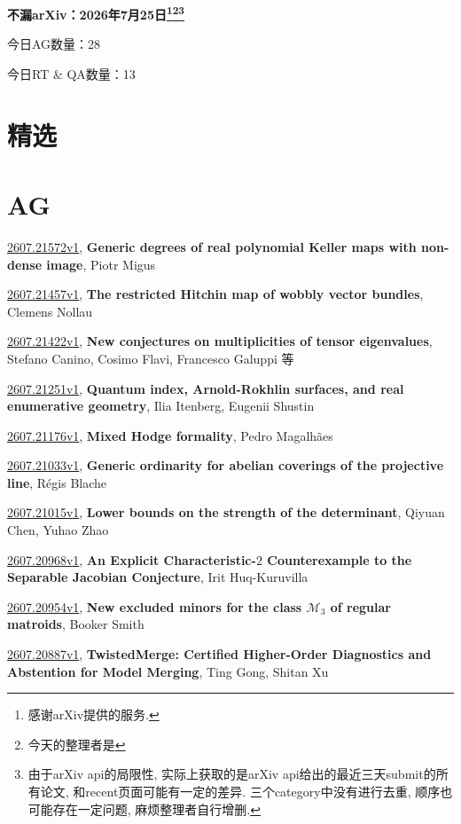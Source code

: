 \documentclass[9pt, a4paper]{article}
\theoremstyle{plain}
\theoremstyle{definition}
\theoremstyle{remark}
\newcommand{\arxiv}[3]{\href{https://arxiv.org/abs/#1}{#1}, \textbf{\textcolor{arxivblue}{#2}}, #3}
\newcommand{\AGnumber}{28}
\newcommand{\RTQAnumber}{13}
\newcommand{\NewestDate}{2026年7月25日}
\newcommand{\todayarXiver}{} %
\begin{document}
\begin{center}
    \Huge\textbf{不漏arXiv：\NewestDate\footnote{感谢arXiv提供的服务.}\footnote{今天的整理者是\todayarXiver}\footnote{由于arXiv api的局限性, 实际上获取的是arXiv api给出的最近三天submit的所有论文, 和recent页面可能有一定的差异. 三个category中没有进行去重, 顺序也可能存在一定问题, 麻烦整理者自行增删.}} \\
\end{center}

\setcounter{section}{-1}

\begin{center}
    今日AG数量：\AGnumber
    
    今日RT \& QA数量：\RTQAnumber
    
\end{center}


\section{精选}


\section{AG}
\arxiv{2607.21572v1}{Generic degrees of real polynomial Keller maps with non-dense image}{Piotr Migus}

\arxiv{2607.21457v1}{The restricted Hitchin map of wobbly vector bundles}{Clemens Nollau}

\arxiv{2607.21422v1}{New conjectures on multiplicities of tensor eigenvalues}{Stefano Canino, Cosimo Flavi, Francesco Galuppi 等}

\arxiv{2607.21251v1}{Quantum index, Arnold-Rokhlin surfaces, and real enumerative geometry}{Ilia Itenberg, Eugenii Shustin}

\arxiv{2607.21176v1}{Mixed Hodge formality}{Pedro Magalhães}

\arxiv{2607.21033v1}{Generic ordinarity for abelian coverings of the projective line}{Régis Blache}

\arxiv{2607.21015v1}{Lower bounds on the strength of the determinant}{Qiyuan Chen, Yuhao Zhao}

\arxiv{2607.20968v1}{An Explicit Characteristic-$2$ Counterexample to the Separable Jacobian Conjecture}{Irit Huq-Kuruvilla}

\arxiv{2607.20954v1}{New excluded minors for the class $\mathcal{M}_3$ of regular matroids}{Booker Smith}

\arxiv{2607.20887v1}{TwistedMerge: Certified Higher-Order Diagnostics and Abstention for Model Merging}{Ting Gong, Shitan Xu}
\end{document}
